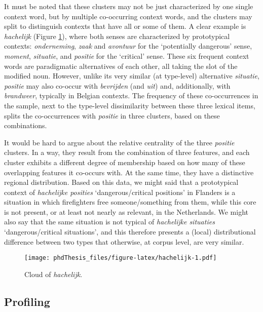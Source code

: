 \documentclass[
]{book}
\begin{document}
It must be noted that these clusters may not be just characterized by one single context word, but by multiple co-occurring context words, and the clusters may split to distinguish contexts that have all or some of them. A clear example is \emph{hachelijk} (Figure \ref{fig:hachelijk}), where both senses are characterized by prototypical contexts: \emph{onderneming}, \emph{zaak} and \emph{avontuur} for the `potentially dangerous' sense, \emph{moment}, \emph{situatie}, and \emph{positie} for the `critical' sense. These six frequent context words are paradigmatic alternatives of each other, all taking the slot of the modified noun. However, unlike its very similar (at type-level) alternative \emph{situatie}, \emph{positie} may also co-occur with \emph{bevrijden} (and \emph{uit}) and, additionally, with \emph{brandweer}, typically in Belgian contexts. The frequency of these co-occurrences in the sample, next to the type-level dissimilarity between these three lexical items, splits the co-occurrences with \emph{positie} in three clusters, based on these combinations.

It would be hard to argue about the relative centrality of the three \emph{positie} clusters. In a way, they result from the combination of three features, and each cluster exhibits a different degree of membership based on how many of these overlapping features it co-occurs with. At the same time, they have a distinctive regional distribution. Based on this data, we might said that a prototypical context of \emph{hachelijke posities} `dangerous/critical positions' in Flanders is a situation in which firefighters free someone/something from them, while this core is not present, or at least not nearly as relevant, in the Netherlands. We might also say that the same situation is not typical of \emph{hachelijke situaties} `dangerous/critical situations', and this therefore presents a (local) distributional difference between two types that otherwise, at corpus level, are very similar.



\begin{figure}
\centering
\texttt{[image: phdThesis\_files/figure-latex/hachelijk-1.pdf]}
\caption{\label{fig:hachelijk}Cloud of \emph{hachelijk}.}
\end{figure}

\hypertarget{profiling}{%
\subsection{Profiling}\label{profiling}}
\end{document}
